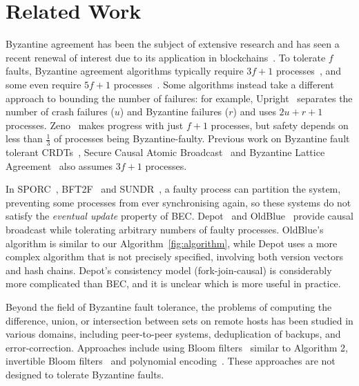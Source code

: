 \documentclass[a4paper,anonymous,USenglish]{lipics-v2019}
\begin{document}
\section{Related Work}\label{sec:relwork}

Byzantine agreement has been the subject of extensive research and has seen a recent renewal of interest due to its application in blockchains~\cite{Bano:2019}.
To tolerate $f$ faults, Byzantine agreement algorithms typically require $3f+1$ processes~\cite{Castro:1999,Kotla:2007,Bessani:2014}, and some even require $5f+1$ processes~\cite{Abd:2005,Martin:2006}.
Some algorithms instead take a different approach to bounding the number of failures: for example, Upright~\cite{Clement:2009} separates the number of crash failures ($u$) and Byzantine failures ($r$) and uses $2u+r+1$ processes.
Zeno~\cite{Singh:2009} makes progress with just $f+1$ processes, but safety depends on less than $\frac{1}{3}$ of processes being Byzantine-faulty.
Previous work on Byzantine fault tolerant CRDTs~\cite{Chai:2014,Shoker:2017,Zhao:2016}, Secure Causal Atomic Broadcast~\cite{Cachin:2001cj,Duan:2017} and Byzantine Lattice Agreement~\cite{DiLuna:2020} also assumes $3f+1$ processes.

In SPORC~\cite{Feldman:2010wl}, BFT2F~\cite{Li:2007} and SUNDR~\cite{Mazieres:2002}, a faulty process can partition the system, preventing some processes from ever synchronising again, so these systems do not satisfy the \emph{eventual update} property of BEC.
Depot~\cite{Mahajan:2011} and OldBlue~\cite{VanGundy:2012} provide causal broadcast while tolerating arbitrary numbers of faulty processes.
OldBlue's algorithm is similar to our Algorithm~\ref{fig:algorithm}, while Depot uses a more complex algorithm that is not precisely specified, involving both version vectors and hash chains.
Depot's consistency model (fork-join-causal) is considerably more complicated than BEC, and it is unclear which is more useful in practice.

Beyond the field of Byzantine fault tolerance, the problems of computing the difference, union, or intersection between sets on remote hosts has been studied in various domains, including peer-to-peer systems, deduplication of backups, and error-correction.
Approaches include using Bloom filters~\cite{Skjegstad:2011} similar to Algorithm 2, invertible Bloom filters~\cite{Goodrich:2011,Eppstein:2011} and polynomial encoding~\cite{Minsky:2006}.
These approaches are not designed to tolerate Byzantine faults.
\end{document}
